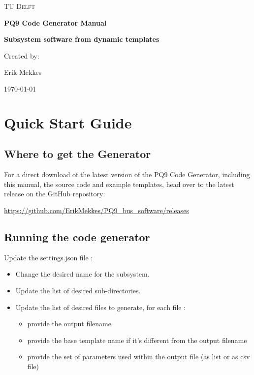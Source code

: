 \documentclass{settings/TU_Delft_Report}
\begin{document}
\begin{titlepage}
	\centering
	{\scshape\LARGE TU Delft \par}
	\vspace{1cm}
	{\huge\bfseries PQ9 Code Generator Manual\par}
	{\Large\bfseries Subsystem software from dynamic templates \par}

	\vfill  %
	{Created by: \par
	    Erik Mekkes}
	
	\vspace{0.3cm}
	
	{\large \today\par} %
\end{titlepage}

\tableofcontents


\chapter{Quick Start Guide}

\section{Where to get the Generator}
For a direct download of the latest version of the PQ9 Code Generator, including this manual, the source code and example templates, head over to the latest release on the GitHub repository:\vsp


\url{https://github.com/ErikMekkes/PQ9_bus_software/releases}

\section{Running the code generator}
Update the settings.json file :
\begin{itemize}
\item Change the desired name for the subsystem.
\item Update the list of desired sub-directories.
\item Update the list of desired files to generate, for each file :
\begin{itemize}
    \item provide the output filename
    \item provide the base template name if it's different from the output filename
    \item provide the set of parameters used within the output file (as list or as csv file)
\end{itemize}
\end{itemize}
\end{document}
